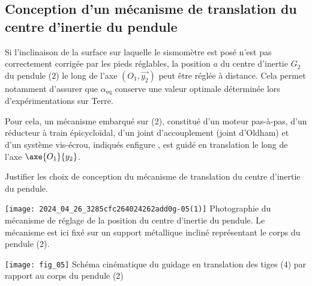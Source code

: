 \subsection{Conception d'un mécanisme de translation du centre d'inertie du pendule}
Si l'inclinaison de la surface sur laquelle le sismomètre est posé n'est pas correctement corrigée par les pieds réglables, la position $a$ du centre d'inertie $G_{2}$ du pendule (2) le long de l'axe $\left(O_{1}, \overrightarrow{y_{2}}\right)$ peut être réglée à distance. Cela permet notamment d'assurer que $\alpha_{\mathrm{eq}}$ conserve une valeur optimale déterminée lors d'expérimentations sur Terre.

Pour cela, un mécanisme embarqué sur (2), constitué d'un moteur pas-à-pas, d'un réducteur à train épicycloïdal, d'un joint d'accouplement (joint d'Oldham) et d'un système vis-écrou, indiqués enfigure \label{ccmp2023_fig_04}, est guidé en translation le long de l'axe  $\axe{O_1}{y_2}$.

\begin{obj}
Justifier les choix de conception du mécanisme de translation du centre d'inertie du pendule.
\end{obj}



\begin{minipage}[c]{.45\linewidth}
    \texttt{[image: 2024\_04\_26\_3285cfc264024262add0g-05(1)]}
     {\label{ccmp2023_fig_04} Photographie du mécanisme de réglage de la position du centre d'inertie du pendule. Le mécanisme est ici fixé sur un support métallique incliné représentant le corps du pendule (2).}
\end{minipage}
\hfill
\begin{minipage}[c]{.45\linewidth}
        \texttt{[image: fig\_05]}
         {\label{ccmp2023_fig_05} Schéma cinématique du guidage en translation des tiges (4) par rapport au corps du pendule (2)}
\end{minipage}


